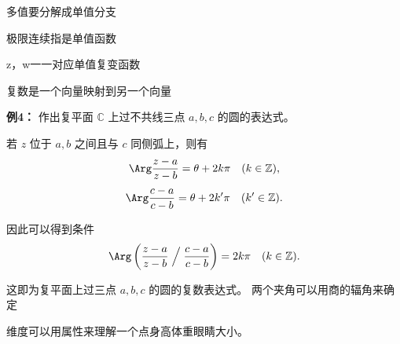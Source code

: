 \documentclass[lang=cn,10pt]{elegantbook}
\begin{document}
多值要分解成单值分支

极限连续指是单值函数

z，w一一对应单值复变函数
\begin{dxtips}
    复数是一个向量映射到另一个向量
\end{dxtips}
\textbf{例4：} 作出复平面 $\mathbb{C}$ 上过不共线三点 $a,b,c$ 的圆的表达式。  

若 $z$ 位于 $a,b$ 之间且与 $c$ 同侧弧上，则有  
\[
\Arg \frac{z-a}{z-b} = \theta + 2k\pi \quad (k \in \mathbb{Z}),
\]
\[
\Arg \frac{c-a}{c-b} = \theta + 2k'\pi \quad (k' \in \mathbb{Z}).
\]

因此可以得到条件  
\[
\Arg \left( \frac{z-a}{z-b} \;\Big/ \;\frac{c-a}{c-b} \right) = 2k\pi \quad (k \in \mathbb{Z}).
\]

这即为复平面上过三点 $a,b,c$ 的圆的复数表达式。
两个夹角可以用商的辐角来确定

维度可以用属性来理解一个点身高体重眼睛大小。
\end{document}
